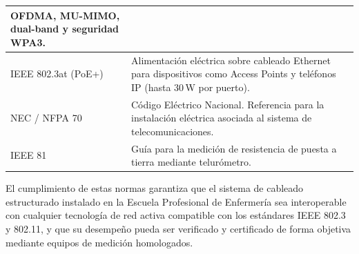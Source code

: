 \begin{table}[H]
\begin{tabular}{|p{4.5cm}|p{9cm}|}
        OFDMA, MU-MIMO, dual-band y seguridad WPA3. \\
        \hline
        IEEE 802.3at (PoE+) &
        Alimentación eléctrica sobre cableado Ethernet para dispositivos
        como Access Points y teléfonos IP (hasta 30\,W por puerto). \\
        \hline
        NEC / NFPA 70 &
        Código Eléctrico Nacional. Referencia para la instalación
        eléctrica asociada al sistema de telecomunicaciones. \\
        \hline
        IEEE 81 &
        Guía para la medición de resistencia de puesta a tierra mediante
        telurómetro. \\
        \hline
    \end{tabular}
\end{table}

El cumplimiento de estas normas garantiza que el sistema de cableado estructurado
instalado en la Escuela Profesional de Enfermería sea interoperable con cualquier
tecnología de red activa compatible con los estándares IEEE 802.3 y 802.11,
y que su desempeño pueda ser verificado y certificado de forma objetiva mediante
equipos de medición homologados.